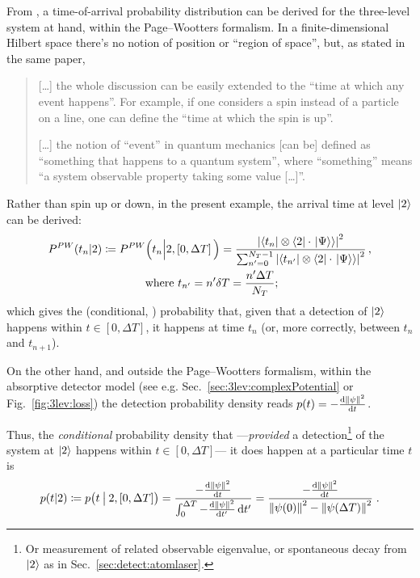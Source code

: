 From \cite{Maccone:QMOT}, a time-of-arrival probability distribution can be derived
for the three-level system at hand, within the Page--Wootters formalism.
In a finite-dimensional
Hilbert space there's no notion of position or ``region of space'', but, as stated in the
same paper,
\begin{quote}
  [\dots] the whole discussion can be easily extended to the “time at which any
  event happens”. For example, if one considers a spin instead of a particle on a line, one can define the “time at
  which the spin is up”.
  
  [\dots] the notion of ``event'' in quantum mechanics [can be] defined as ``something that happens to a
  quantum system'', where ``something'' means ``a system
  observable property taking some value [\dots]''.
\end{quote}
Rather than spin up or down, in the present example, the arrival time at level $\ket{2}$
can be derived:
\begin{multline}\label{eq:3lev:bayesPW}
  P^{PW}(t_n|2) \coloneqq P^{PW}\Big( t_n \Big| 2, \left[0,\Delta{T}\right]\Big) = \frac{
    \abs{\bra{t_n} \otimes \bra{2} \cdot \left.\left| \Psi \right\rangle\right\rangle}^2
  }{
    \sum_{n'=0}^{N_{T} - 1} \abs{\bra{t_{n'}} \otimes \bra{2} \cdot \left.\left| \Psi \right\rangle\right\rangle}^2
  }
  \,\text{,}
  \\
  \text{ where } t_{n'} = n'\delta{T} = \frac{n'\Delta{T}}{N_{T}}
  \text{;}
\end{multline}
which gives the (conditional, ) probability that, given that a detection of $\ket{2}$
happens
within $t \in [0, \Delta T]$, it happens at time $t_n$ (or, more correctly, between $t_n$ and $t_{n+1}$).

On the other hand, and outside the Page--Wootters formalism,
within  the absorptive detector model
(see e.g. Sec.~\ref{sec:3lev:complexPotential} or Fig.~\ref{fig:3lev:loss})
the detection probability density reads $p(t) = - \dv{\norm{\psi}^2}{t}$.

Thus, the \emph{conditional} probability density that
---\emph{provided }a detection\footnote{
  Or measurement of related observable eigenvalue,
  or spontaneous decay from $\ket{2}$ as in Sec.~\ref{sec:detect:atomlaser}.
}
of the system at $\ket{2}$ happens within $t \in [0, \Delta{T}]$---
it does happen at a particular time $t$ is
\begin{equation}\label{3lev:condProb}
  p(t|2) \coloneqq p\big(t   \:\big|\:   2,[0,\Delta{T}]\big)
  =
  \frac{
    - \dv{\norm{\psi}^2}{t}
  }{
    \int_{0}^{\Delta{T}} - \dv{\norm{\psi}^2}{t'} \dd{t'}
  }
  =
  \frac{
    - \dv{\norm{\psi}^2}{t}
  }{
    \norm{\psi(0)}^2 - \norm{\psi(\Delta{T})}^2
  }
  \;\text{.}
\end{equation}

